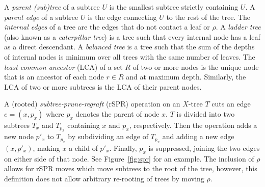 \documentclass[]{elsarticle}
\begin{document}
A \emph{parent (sub)tree} of a subtree $U$ is the smallest subtree strictly containing $U$.
A \emph{parent edge} of a subtree $U$ is the edge connecting $U$ to the rest of the tree.
The \emph{internal edges} of a tree are the edges that do not contact a leaf or $\rho$.
A \emph{ladder tree} (also known as a \emph{caterpillar tree}) is a tree such that every internal node has a leaf as a direct descendant.
A \emph{balanced tree} is a tree such that the sum of the depths of internal nodes is minimum over all trees with the same number of leaves.
The \emph{least common ancestor} (LCA) of a set $R$ of two or more nodes is the unique node that is an ancestor of each node $r \in R$ and at maximum depth.
Similarly, the LCA of two or more subtrees is the LCA of their parent nodes.

A (rooted) \emph{subtree-prune-regraft} (rSPR) operation on an $X$-tree $T$ cuts an edge $e = (x, p_x)$ where $p_x$ denotes the parent of node $x$.
$T$ is divided into two subtrees $T_x$ and $T_{p_x}$ containing $x$ and $p_x$, respectively.
Then the operation adds a new node $p'_x$ to $T_{p_x}$ by subdividing an edge of $T_{p_x}$ and adding a new edge $(x, p'_x)$, making $x$ a child of $p'_x$.
Finally, $p_x$ is suppressed, joining the two edges on either side of that node.
See Figure~\ref{fig:spr} for an example.
The inclusion of $\rho$ allows for rSPR moves which move subtrees to the root of the tree, however, this definition does not allow arbitrary re-rooting of trees by moving $\rho$.
\end{document}
